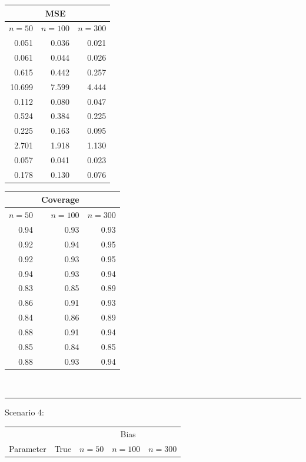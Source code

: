 \documentclass[useAMS,referee]{biom}
\begin{document}
\begin{table}[htb]
\begin{minipage}[b]{.43\textwidth}
\begin{tabular}{lrrrr}
\end{tabular}
\end{minipage}
\begin{minipage}[b]{.28\textwidth} 		
\begin{tabular}{rrr} 
	& \multicolumn{1}{c}{MSE}  &\\ 
	\hline
	$n=50$ & $n=100$ & $n=300$   \\ 	
	\hline 
	0.051&	0.036&	0.021\\
	0.061&	0.044&	0.026\\
	0.615&	0.442&	0.257\\
	10.699&	7.599&	4.444\\
	0.112&	0.080&	0.047\\
	0.524&	0.384&	0.225\\
	0.225&	0.163&	0.095\\
	2.701&	1.918&	1.130\\
	0.057&	0.041&	0.023\\
	0.178&	0.130&	0.076\\ 	
\end{tabular}
\end{minipage}
\begin{minipage}[b]{.1\textwidth} 		
\begin{tabular}{rrr} 
	& \multicolumn{1}{c}{Coverage} &  \\ 
\hline
	$n=50$ & $n=100$ & $n=300$   \\ 	
	\midrule 
	0.94&	0.93&	0.93\\
	0.92&	0.94&	0.95\\
	0.92&	0.93&	0.95\\
	0.94&	0.93&	0.94\\
	0.83&	0.85&	0.89\\
	0.86&	0.91&	0.93\\
	0.84&	0.86&	0.89\\
	0.88&	0.91&	0.94\\
	0.85&	0.84&	0.85\\
	0.88&	0.93&	0.94\\	
\end{tabular}
\end{minipage}
\\\hrule\vspace{0.2cm}
Scenario 4:\\
\begin{minipage}[b]{.43\textwidth}
\begin{tabular}{lrrrr} 
	& &   \multicolumn{3}{c}{Bias}  \\ 
	\cmidrule{3-5}
	Parameter	&  True & $n=50$ & $n=100$ & $n=300$   \\ 			\midrule 

\end{tabular}
\end{minipage}
\end{table}
\end{document}
